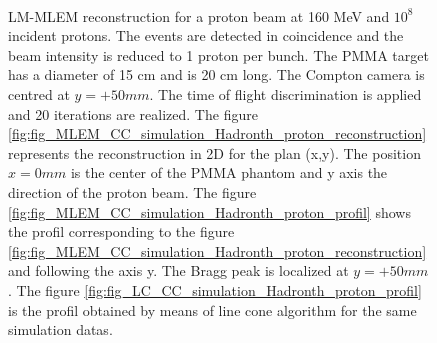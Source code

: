 \begin{figure} [!h]
 \\
  \label{fig:comparaison}
\caption{LM-MLEM reconstruction for a proton beam at 160 MeV and $10^{8}$ incident protons. The events are detected in coincidence and the beam intensity is reduced to 1 proton per bunch. The PMMA target has a diameter of 15 cm and is 20 cm long. The Compton camera is centred at $y=+50 mm$. The time of flight discrimination is applied and 20 iterations are realized. The figure \ref{fig:fig_MLEM_CC_simulation_Hadronth_proton_reconstruction} represents the reconstruction in 2D for the plan (x,y). The position $x=0 mm$ is the center of the PMMA phantom and y axis the direction of the proton beam. The figure \ref{fig:fig_MLEM_CC_simulation_Hadronth_proton_profil} shows the profil corresponding to the figure \ref{fig:fig_MLEM_CC_simulation_Hadronth_proton_reconstruction} and following the axis y. The Bragg peak is localized at $y=+50 mm$. The figure \ref{fig:fig_LC_CC_simulation_Hadronth_proton_profil} is the profil obtained by means of line cone algorithm for the same simulation datas.}

\end{figure}

